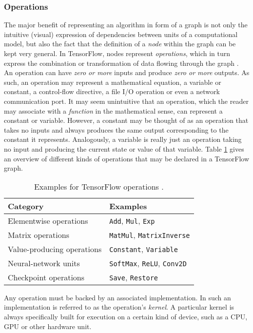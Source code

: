 \subsubsection{Operations}\label{sec:model-graphs-ops}

The major benefit of representing an algorithm in form of a graph is not only
the intuitive (visual) expression of dependencies between units of a
computational model, but also the fact that the definition of a \emph{node}
within the graph can be kept very general. In TensorFlow, nodes represent
\emph{operations}, which in turn express the combination or transformation of
data flowing through the graph \cite{tensorflow}. An operation can have
\emph{zero or more} inputs and produce \emph{zero or more} outputs. As such, an
operation may represent a mathematical equation, a variable or constant, a
control-flow directive, a file I/O operation or even a network communication
port. It may seem unintuitive that an operation, which the reader may associate
with a \emph{function} in the mathematical sense, can represent a constant or
variable. However, a constant may be thought of as an operation that takes no
inputs and always produces the same output corresponding to the constant it
represents. Analogously, a variable is really just an operation taking no input
and producing the current state or value of that variable. Table \ref{tab:ops}
gives an overview of different kinds of operations that may be declared in a
TensorFlow graph.

\begin{table}
  \begin{tabular}{ll}
    \textbf{Category} & \textbf{Examples}
    \\ \toprule
    Elementwise operations & \texttt{Add}, \texttt{Mul}, \texttt{Exp}
    \\
    Matrix operations & \texttt{MatMul}, \texttt{MatrixInverse}
    \\
    Value-producing operations & \texttt{Constant}, \texttt{Variable}
    \\
    Neural-network units & \texttt{SoftMax}, \texttt{ReLU}, \texttt{Conv2D}
    \\
    Checkpoint operations & \texttt{Save}, \texttt{Restore}
    \end{tabular}
    \label{tab:ops}
    \caption{Examples for TensorFlow operations \cite{tensorflow}.}
\end{table}

Any operation must be backed by an associated implementation. In
\cite{tensorflow} such an implementation is referred to as the operation's
\emph{kernel}. A particular kernel is always specifically built for execution on
a certain kind of device, such as a CPU, GPU or other hardware unit.

